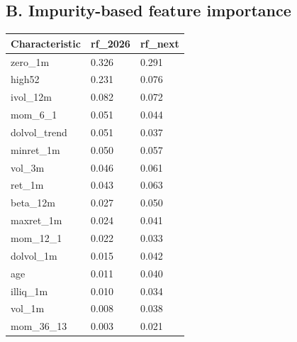 \documentclass[
  10pt,
  a4paper,
]{article}
\newcounter{none} %
\begin{document}
\subsection{B. Impurity-based feature
importance}\label{b.-impurity-based-feature-importance}

{\def\LTcaptype{none} %
\begin{longtable}[]{@{}lll@{}}
\toprule\noalign{}
Characteristic & rf\_2026 & rf\_next \\
\midrule\noalign{}
\endhead
\bottomrule\noalign{}
\endlastfoot
zero\_1m & 0.326 & 0.291 \\
high52 & 0.231 & 0.076 \\
ivol\_12m & 0.082 & 0.072 \\
mom\_6\_1 & 0.051 & 0.044 \\
dolvol\_trend & 0.051 & 0.037 \\
minret\_1m & 0.050 & 0.057 \\
vol\_3m & 0.046 & 0.061 \\
ret\_1m & 0.043 & 0.063 \\
beta\_12m & 0.027 & 0.050 \\
maxret\_1m & 0.024 & 0.041 \\
mom\_12\_1 & 0.022 & 0.033 \\
dolvol\_1m & 0.015 & 0.042 \\
age & 0.011 & 0.040 \\
illiq\_1m & 0.010 & 0.034 \\
vol\_1m & 0.008 & 0.038 \\
mom\_36\_13 & 0.003 & 0.021 \\
\end{longtable}
}
\end{document}
